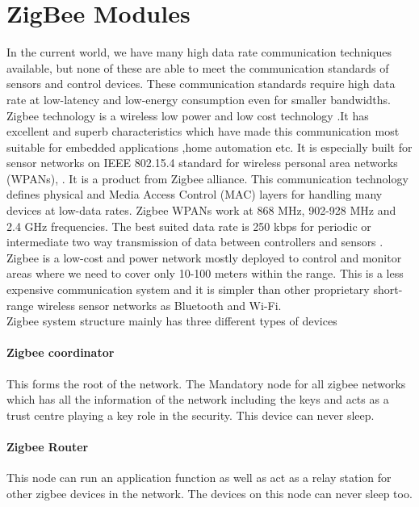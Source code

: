 \section{ZigBee Modules}
	In the current world, we have many high data rate communication techniques available, but none of these are able to meet the communication standards of sensors and control devices. These communication standards require high data rate at low-latency and low-energy consumption  even for smaller bandwidths. Zigbee technology is a wireless low power and low cost technology .It has excellent and superb characteristics which have made this communication most suitable for embedded applications ,home automation etc. It is especially built for sensor networks on IEEE 802.15.4 standard for wireless personal area networks (WPANs), . It is a product from Zigbee alliance. This communication technology defines physical and Media Access Control (MAC) layers for handling many devices at low-data rates. Zigbee WPANs work at 868 MHz, 902-928 MHz and 2.4 GHz frequencies. The best suited data rate is 250 kbps for periodic or intermediate two way transmission of data between controllers and sensors . Zigbee is a  low-cost and power network mostly deployed to control and monitor areas where we need to cover only 10-100 meters within the range. This is a less expensive communication system and it is simpler than other proprietary short-range wireless sensor networks  as Bluetooth and Wi-Fi.\\
	\newline
	Zigbee system structure mainly has three different types of devices
	\paragraph{Zigbee coordinator}
	 This forms the root of the network. The Mandatory node for all zigbee networks which has all the information of the network including the keys and acts as a trust centre  playing a key role in the security. This device can never sleep.
	 \paragraph{Zigbee Router}
	   This node can run an application function as well as act as a relay station for other zigbee devices in the network. The devices on this node can never sleep too.
